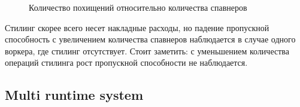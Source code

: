 \begin{figure}[H]
    \begin{center}
    \end{center}

    \caption{Количество похищений относительно количества спавнеров}
    \label{fig:tatlin:metrics:steal_ops}
\end{figure}

Стилинг скорее всего несет накладные расходы, но падение пропускной способность с увеличением количества спавнеров наблюдается в случае одного воркера, где стилинг отсутствует. Стоит заметить: с уменьшением количества операций стилинга рост пропускной способности не наблюдается.

\subsection{Multi runtime system}

